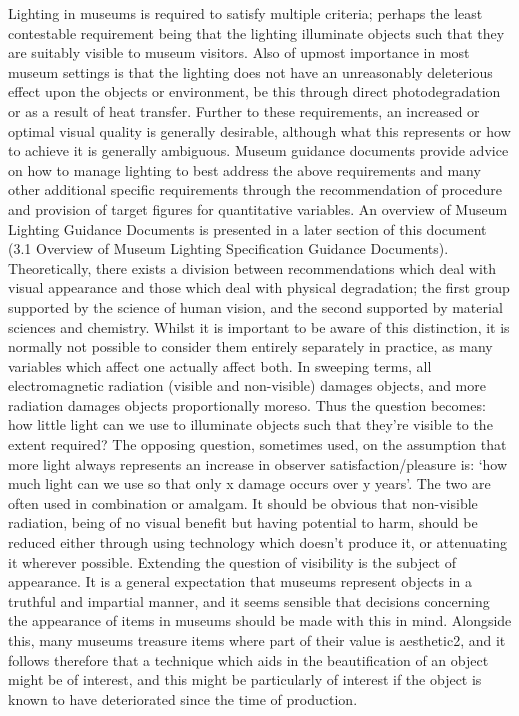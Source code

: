 Lighting in museums is required to satisfy multiple criteria; perhaps the least contestable requirement being that the lighting illuminate objects such that they are suitably visible to museum visitors. Also of upmost importance in most museum settings is that the lighting does not have an unreasonably deleterious effect upon the objects or environment, be this through direct photodegradation or as a result of heat transfer. Further to these requirements, an increased or optimal visual quality is generally desirable, although what this represents or how to achieve it is generally ambiguous.
Museum guidance documents provide advice on how to manage lighting to best address the above requirements and many other additional specific requirements through the recommendation of procedure and provision of target figures for quantitative variables. An overview of Museum Lighting Guidance Documents is presented in a later section of this document (3.1 Overview of Museum Lighting Specification Guidance Documents).
Theoretically, there exists a division between recommendations which deal with visual appearance and those which deal with physical degradation; the first group supported by the science of human vision, and the second supported by material sciences and chemistry. Whilst it is important to be aware of this distinction, it is normally not possible to consider them entirely separately in practice, as many variables which affect one actually affect both.
In sweeping terms, all electromagnetic radiation (visible and non-visible) damages objects, and more radiation damages objects proportionally moreso. Thus the question becomes: how little light can we use to illuminate objects such that they're visible to the extent required? The opposing question, sometimes used, on the assumption that more light always represents an increase in observer satisfaction/pleasure is: `how much light can we use so that only x damage occurs over y years'. The two are often used in combination or amalgam. It should be obvious that non-visible radiation, being of no visual benefit but having potential to harm, should be reduced either through using technology which doesn't produce it, or attenuating it wherever possible.
Extending the question of visibility is the subject of appearance. It is a general expectation that museums represent objects in a truthful and impartial manner, and it seems sensible that decisions concerning the appearance of items in museums should be made with this in mind. Alongside this, many museums treasure items where part of their value is aesthetic2, and it follows therefore that a technique which aids in the beautification of an object might be of interest, and this might be particularly of interest if the object is known to have deteriorated since the time of production.

